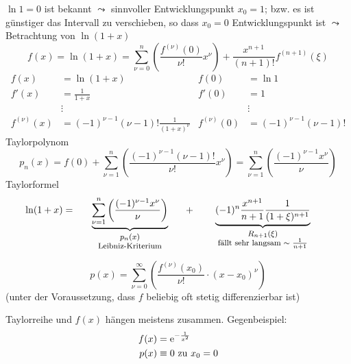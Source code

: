 \begin{example}[Logarithmus]
  $\ln 1 = 0$ ist bekannt $\leadsto$ sinnvoller Entwicklungspunkt $x_0 = 1$; bzw. es ist günstiger das Intervall zu verschieben, so dass $x_0 = 0$ Entwicklungspunkt ist $\leadsto$ Betrachtung von $\ln (1+x)$
  \[ f(x) = \ln (1+x) = \sum_{\nu = 0}^n \left( \frac{f^{(\nu)}(0)}{\nu !} x^\nu \right) + \frac{x^{n+1}}{(n+1)!} f^{(n+1)}(\xi) \]
  \begin{align*}
    f(x) &= \ln (1+x) & f(0) &= \ln 1 \\
    f'(x) &= \frac 1 {1+x} & f'(0) &= 1 \\
    &\vdots & &\vdots \\
    f^{(\nu)}(x) &= (-1)^{\nu-1} (\nu - 1)! \frac 1 {(1+x)^\nu} & f^{(\nu)}(0) &= (-1)^{\nu-1} (\nu -1)!
  \end{align*}
  Taylorpolynom
  \[
    p_n(x) = f(0) + \sum_{\nu = 1}^{n} \left( \frac{(-1)^{\nu-1} (\nu -1)!}{\nu !} x^\nu \right)
    = \sum_{\nu = 1}^{n} \left( \frac{(-1)^{\nu-1} x^\nu}{\nu} \right)
  \]
  Taylorformel
  \[
    \ln (1+x) = \underbrace{\sum_{\nu = 1}^{n} \left( \frac{(-1)^{\nu-1} x^\nu}{\nu} \right)}_{\parbox{4cm}{\centering\footnotesize $p_n(x)$\\Leibniz-Kriterium}} + \underbrace{(-1)^n \frac{x^{n+1}}{n+1} \frac 1 {(1+\xi)^{n+1}}}_{\parbox{5cm}{\centering \footnotesize $R_{n+1}(\xi)$\\fällt sehr langsam $\sim \frac 1 {n+1}$}}
  \]
\end{example}

\begin{definition}[Taylorreihe]
  \[ p(x) = \sum_{\nu = 0}^\infty \left( \frac{f^{(\nu)}(x_0)}{\nu !} \cdot (x - x_0)^\nu \right) \]
  (unter der Voraussetzung, dass $f$ beliebig oft stetig differenzierbar ist)
\end{definition}

\begin{note}
  Taylorreihe und $f(x)$ hängen meistens zusammen. Gegenbeispiel:
  \begin{align*}
    f(x) &= \operatorname{e}^{-\frac 1 {x^2}}\\
    p(x) &\equiv 0 \text{ zu } x_0 = 0 
  \end{align*}
\end{note}